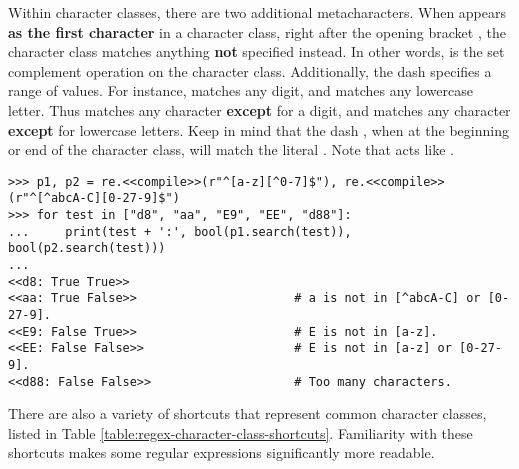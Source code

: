 Within character classes, there are two additional metacharacters.
When \li{^} appears \textbf{as the first character} in a character class, right after the opening bracket \li{[}, the character class matches anything \textbf{not} specified instead.
In other words, \li{^} is the set complement operation on the character class.
Additionally, the dash \li{-} specifies a range of values.
For instance, \li{[0-9]} matches any digit, and \li{[a-z]} matches any lowercase letter.
Thus \li{[^0-9]} matches any character \textbf{except} for a digit, and \li{[^a-z]} matches any character \textbf{except} for lowercase letters. Keep in mind that the dash \li{-}, when at the beginning or end of the character class, will match the literal .
Note that \li{[0-27-9]} acts like \li{[(0-2)|(7-9)]}.


\begin{lstlisting}
>>> p1, p2 = re.<<compile>>(r"^[a-z][^0-7]$"), re.<<compile>>(r"^[^abcA-C][0-27-9]$")
>>> for test in ["d8", "aa", "E9", "EE", "d88"]:
...     print(test + ':', bool(p1.search(test)), bool(p2.search(test)))
...
<<d8: True True>>
<<aa: True False>>                      # a is not in [^abcA-C] or [0-27-9].
<<E9: False True>>                      # E is not in [a-z].
<<EE: False False>>                     # E is not in [a-z] or [0-27-9].
<<d88: False False>>                    # Too many characters.
\end{lstlisting}


There are also a variety of shortcuts that represent common character classes, listed in Table \ref{table:regex-character-class-shortcuts}.
Familiarity with these shortcuts makes some regular expressions significantly more readable.

